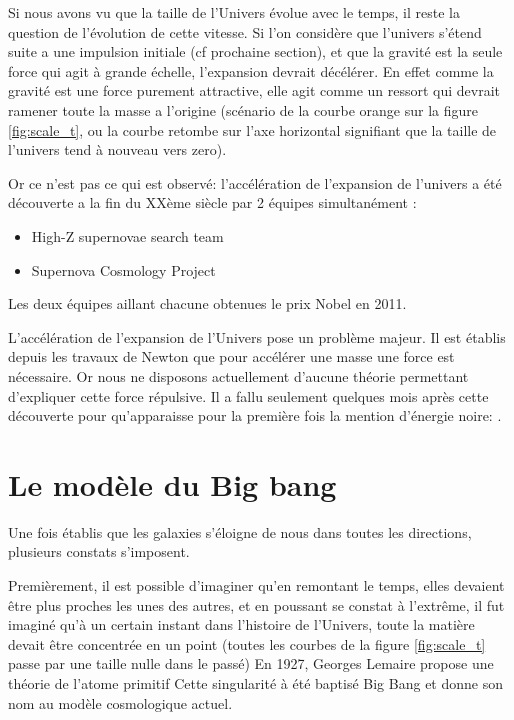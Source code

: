 Si nous avons vu que la taille de l'Univers évolue avec le temps, il reste la question de l’évolution de cette vitesse.
Si l'on considère que l'univers s'étend suite a une impulsion initiale (cf prochaine section), et que la gravité est la seule force qui agit à grande échelle, l'expansion devrait décélérer.
En effet comme la gravité est une force purement attractive, elle agit comme un ressort qui devrait ramener toute la masse a l'origine (scénario de la courbe orange sur la figure \ref{fig:scale_t}, ou la courbe retombe sur l'axe horizontal signifiant que la taille de l'univers tend à nouveau vers zero).

Or ce n'est pas ce qui est observé: l'accélération de l'expansion de l'univers a été découverte a la fin du XXème siècle par 2 équipes simultanément :
\begin{itemize}
\item  High-Z supernovae search team \citep{1998AJ....116.1009R} %
\item  Supernova Cosmology Project \citep{1999ApJ...517..565P} %
\end{itemize}
Les deux équipes aillant chacune obtenues le prix Nobel en 2011.

L'accélération de l'expansion de l'Univers pose un problème majeur.
Il est établis depuis les travaux de Newton que pour accélérer une masse une force est nécessaire.
Or nous ne disposons actuellement d'aucune théorie permettant d'expliquer cette force répulsive.
Il a fallu seulement quelques mois après cette découverte pour qu’apparaisse pour la première fois la mention d'énergie noire: \citep{1999PhRvD..60h1301H}.


\section{Le modèle du Big bang}


Une fois établis que les galaxies s'éloigne de nous dans toutes les directions, plusieurs constats s'imposent.

Premièrement, il est possible d'imaginer qu'en remontant le temps, elles devaient être plus proches les unes des autres, et en poussant se constat à l’extrême, il fut imaginé qu'à un certain instant dans l'histoire de l'Univers, toute la matière devait être concentrée en un point (toutes les courbes de la figure \ref{fig:scale_t} passe par une taille nulle dans le passé)
En 1927, Georges Lemaire propose une théorie de l'atome primitif \cite{1927ASSB...47...49L} 
Cette singularité à été baptisé Big Bang et donne son nom au modèle cosmologique actuel.

